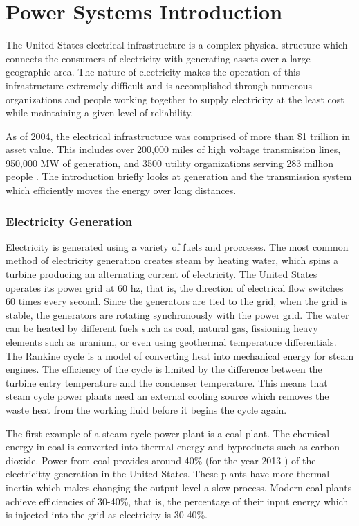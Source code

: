 \section{Power Systems Introduction}
The United States electrical infrastructure is a complex physical structure which connects the consumers of electricity with generating assets over a large geographic area.  The nature of electricity makes the operation of this infrastructure extremely difficult and is accomplished through numerous organizations and people working together to supply electricity at the least cost while maintaining a given level of reliability.

	As of 2004, the electrical infrastructure was comprised of more than \$1 trillion in asset value.  This includes over 200,000 miles of high voltage transmission lines, 950,000 MW of generation, and 3500 utility organizations serving 283 million people \cite{northeast_2003}.  The introduction briefly looks at generation and the transmission system which efficiently moves the energy over long distances.

\subsubsection{Electricity Generation}
	Electricity is generated using a variety of fuels and procceses.  The most common method of electricity generation creates steam by heating water, which spins a turbine producing an alternating current of electricity.  The United States operates its power grid at 60 hz, that is, the direction of electrical flow switches 60 times every second.  Since the generators are tied to the grid, when the grid is stable, the generators are rotating synchronously with the power grid.  The water can be heated by different fuels such as coal, natural gas, fissioning heavy elements such as uranium, or even using geothermal temperature differentials.  The Rankine cycle is a model of converting heat into mechanical energy for steam engines.  The efficiency of the cycle is limited by the difference between the turbine entry temperature and the condenser temperature.  This means that steam cycle power plants need an external cooling source which removes the waste heat from the working fluid before it begins the cycle again.  

	The first example of a steam cycle power plant is a coal plant.  The chemical energy in coal is converted into thermal energy and byproducts such as carbon dioxide.  Power from coal provides around 40\% (for the year 2013 \cite{eia_gov}) of the electricitty generation in the United States. These plants have more thermal inertia which makes changing the output level a slow process.  Modern coal plants achieve efficiencies of 30-40\%, that is, the percentage of their input energy which is injected into the grid as electricity is 30-40\%.

